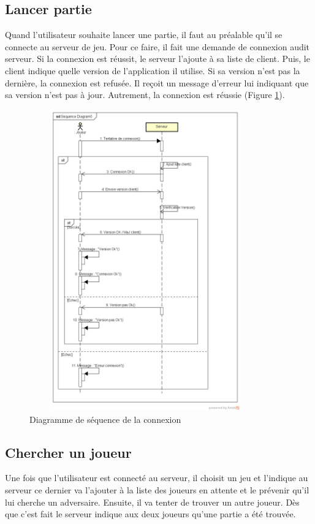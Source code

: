 \documentclass{report}
\begin{document}
\subsection{Lancer partie}
Quand l'utilisateur souhaite lancer une partie, il faut au préalable qu'il se connecte au serveur de jeu. Pour ce faire, il fait une demande de connexion audit serveur.
Si la connexion est réussit, le serveur l'ajoute à sa liste de client. Puis, le client indique quelle version de l'application il utilise.
Si sa version n'est pas la dernière, la connexion est refusée. Il reçoit un message d'erreur lui indiquant que sa version n'est pas à jour.
Autrement, la connexion est réussie (Figure \ref{diagramme-connexion}).
\begin{figure}[ht]
	\centering\includegraphics[width=10cm, height=13cm]{ConnexionServeur}
	\caption{Diagramme de séquence de la connexion}
	\label{diagramme-connexion}
\end{figure}
\subsection{Chercher un joueur}
Une fois que l'utilisateur est connecté au serveur, il choisit un jeu et l'indique au serveur ce dernier va l'ajouter à la liste des joueurs en attente et le prévenir
qu'il lui cherche un adversaire. Ensuite, il va tenter de trouver un autre joueur. Dès que c'est fait le serveur indique aux deux joueurs qu'une partie a été trouvée.
\end{document}
